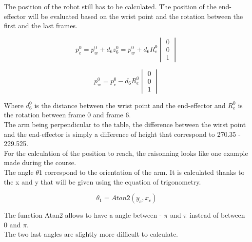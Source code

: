 The position of the robot still has to be calculated. The position of the end-effector will be evaluated based on the wrist point and the rotation between the first and the last frames. \\

\begin{center}
	\begin{equation}
		p^0_e = p^0_w + d_6 z ^0_6 = p^0_w + d_6 R_e^0 \begin{vmatrix}
		0 \\ 0 \\ 1
		\end{vmatrix}
	\end{equation}
\end{center}

\begin{center}
	\begin{equation}
		p^0_w = p^0_e - d_6 R_e^0 \begin{vmatrix}
		0 \\ 0 \\ 1
		\end{vmatrix}
	\end{equation}
\end{center}

Where $d_6^0$ is the distance between the wrist point and the end-effector and $R^0_e$ is the rotation between frame 0 and frame 6.\\
The arm being perpendicular to the table, the difference between the wirst point and the end-effector is simply a difference of height that correspond to 270.35 - 229.525. \\


For the calculation of the position to reach, the raisonning looks like one example made during the course.\\
The angle $\theta1$ correspond to the orientation of the arm. It is calculated thanks to the x and y that will be given using the equation of trigonometry.\\

\begin{center}
	\begin{equation}
		\theta_1 = Atan2(y_c,x_c)
	\end{equation}
\end{center}

\noindent The function Atan2 allows to have a angle between - $\pi$ and $\pi$ instead of between 0 and $\pi$.\\

\noindent The two last angles are slightly more difficult to calculate.\\

